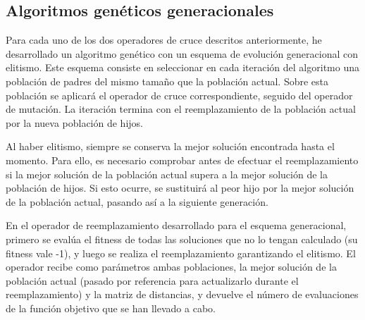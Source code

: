 \documentclass[10pt,a4paper]{article}
\begin{document}
\subsection{Algoritmos genéticos generacionales}

Para cada uno de los dos operadores de cruce descritos anteriormente, he desarrollado un algoritmo genético con un esquema de evolución generacional con elitismo. Este esquema consiste en seleccionar en cada iteración del algoritmo una población de padres del mismo tamaño que la población actual. Sobre esta población se aplicará el operador de cruce correspondiente, seguido del operador de mutación. La iteración termina con el reemplazamiento de la población actual por la nueva población de hijos.

Al haber elitismo, siempre se conserva la mejor solución encontrada hasta el momento. Para ello, es necesario comprobar antes de efectuar el reemplazamiento si la mejor solución de la población actual supera a la mejor solución de la población de hijos. Si esto ocurre, se sustituirá al peor hijo por la mejor solución de la población actual, pasando así a la siguiente generación.

En el operador de reemplazamiento desarrollado para el esquema generacional, primero se evalúa el fitness de todas las soluciones que no lo tengan calculado (su fitness vale -1), y luego se realiza el reemplazamiento garantizando el elitismo. El operador recibe como parámetros ambas poblaciones, la mejor solución de la población actual (pasado por referencia para actualizarlo durante el reemplazamiento) y la matriz de distancias, y devuelve el número de evaluaciones de la función objetivo que se han llevado a cabo.\\
\end{document}
